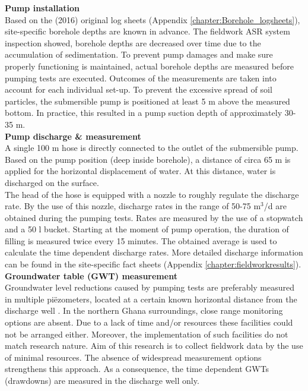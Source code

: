 \textbf{Pump installation} \\
Based on the (2016) original log sheets (Appendix \ref{chapter:Borehole_logsheets}), site-specific borehole depths are known in advance. The fieldwork ASR system inspection showed, borehole depths are decreased over time due to the accumulation of sedimentation. To prevent pump damages and make sure properly functioning is maintained, actual borehole depths are measured before pumping tests are executed. Outcomes of the measurements are taken into account for each individual set-up. To prevent the excessive spread of soil particles, the submersible pump is positioned at least 5 m above the measured bottom. In practice, this resulted in a pump suction depth of approximately 30-35 m.
\bigskip \\
\textbf{Pump discharge \& measurement} \\
A single 100 m hose is directly connected to the outlet of the submersible pump. Based on the pump position (deep inside borehole), a distance of circa 65 m is applied for the horizontal displacement of water. At this distance, water is discharged on the surface.
\\
The head of the hose is equipped with a nozzle to roughly regulate the discharge rate. By the use of this nozzle, discharge rates in the range of 50-75 m$^{3}$/d are obtained during the pumping tests. Rates are measured by the use of a stopwatch and a 50 l bucket. Starting at the moment of pump operation, the duration of filling is measured twice every 15 minutes. The obtained average is used to calculate the time dependent discharge rates. More detailed discharge information can be found in the site-specific fact sheets (Appendix \ref{chapter:fieldworkresults}).
\bigskip \\
\textbf{Groundwater table (GWT) measurement} \\
Groundwater level reductions caused by pumping tests are preferably measured in multiple piëzometers, located at a certain known horizontal distance from the discharge well \citep{Kruseman2000}. In the northern Ghana surroundings, close range monitoring options are absent. Due to a lack of time and/or resources these facilities could not be arranged either. Moreover, the implementation of such facilities do not match research nature. Aim of this research is to collect fieldwork data by the use of minimal resources. The absence of widespread measurement options strengthens this approach. As a consequence, the time dependent GWTs (drawdowns) are measured in the discharge well only. \\

